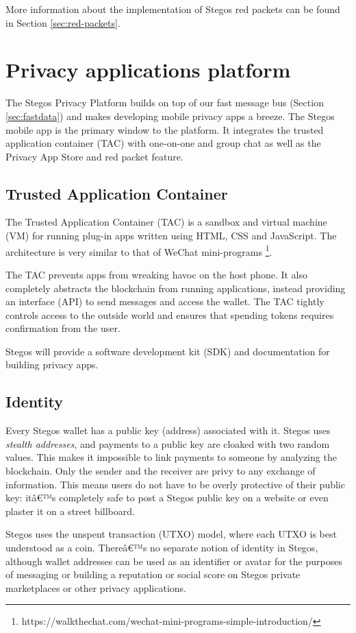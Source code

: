 \documentclass[8pt,fleqn,openany]{book}
\begin{document}
	More information about the implementation of Stegos red packets can be found in Section \ref{sec:red-packets}.
	
	\chapter{Privacy applications platform}\label{chap:privacy-app-platform}
	The Stegos Privacy Platform builds on top of our fast message bus (Section \ref{sec:fastdata}) and makes developing mobile privacy apps a breeze. The Stegos mobile app is the primary window to the platform. It integrates the trusted application container (TAC) with one-on-one and group chat as well as the Privacy App Store and red packet feature. 
	
	\section{Trusted Application Container}\label{sec:tac}
	The Trusted Application Container (TAC) is a sandbox and virtual machine (VM) for running plug-in apps written using HTML, CSS and JavaScript. The architecture is very similar to that of WeChat mini-programs \footnote{https://walkthechat.com/wechat-mini-programs-simple-introduction/}.
	
	The TAC prevents apps from wreaking havoc on the host phone. It also completely abstracts the blockchain from running applications, instead providing an interface (API) to send messages and access the wallet. The TAC tightly controls access to the outside world and ensures that spending tokens requires confirmation from the user. 
	
	Stegos will provide a software development kit (SDK) and documentation for building privacy apps. 
	
	\section{Identity}\label{sec:identity}
	Every Stegos wallet has a public key (address) associated with it. Stegos uses \textit{stealth addresses}, and payments to a public key are cloaked with two random values. This makes it impossible to link payments to someone by analyzing the blockchain. Only the sender and the receiver are privy to any exchange of information. This means users do not have to be overly protective of their public key: itâ€™s completely safe to post a Stegos public key on a website or even plaster it on a street billboard. 
	
	Stegos uses the unspent transaction (UTXO) model, where each UTXO is best understood as a coin. Thereâ€™s no separate notion of identity in Stegos, although wallet addresses can be used as an identifier or avatar for the purposes of messaging or building a reputation or social score on Stegos private marketplaces or other privacy applications. 
	
\end{document}
